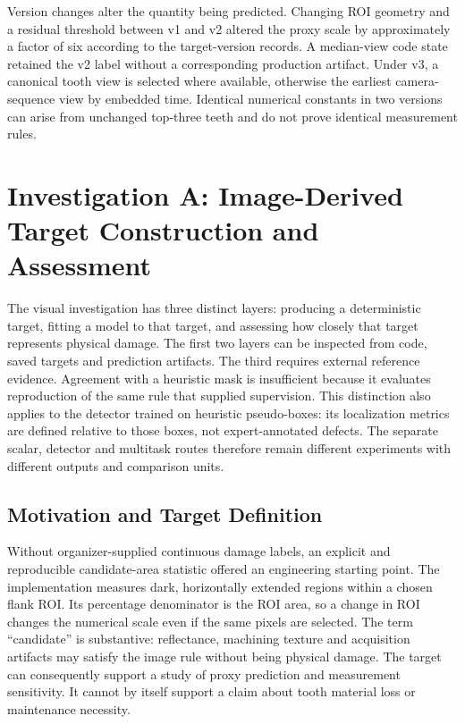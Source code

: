 Version changes alter the quantity being predicted. Changing ROI geometry and a residual threshold between v1 and v2 altered the proxy scale by approximately a factor of six according to the target-version records. A median-view code state retained the v2 label without a corresponding production artifact. Under v3, a canonical tooth view is selected where available, otherwise the earliest camera-sequence view by embedded time. Identical numerical constants in two versions can arise from unchanged top-three teeth and do not prove identical measurement rules.

\section{Investigation A: Image-Derived Target Construction and Assessment}
The visual investigation has three distinct layers: producing a deterministic target, fitting a model to that target, and assessing how closely that target represents physical damage. The first two layers can be inspected from code, saved targets and prediction artifacts. The third requires external reference evidence. Agreement with a heuristic mask is insufficient because it evaluates reproduction of the same rule that supplied supervision. This distinction also applies to the detector trained on heuristic pseudo-boxes: its localization metrics are defined relative to those boxes, not expert-annotated defects. The separate scalar, detector and multitask routes therefore remain different experiments with different outputs and comparison units.

\subsection{Motivation and Target Definition}
Without organizer-supplied continuous damage labels, an explicit and reproducible candidate-area statistic offered an engineering starting point. The implementation measures dark, horizontally extended regions within a chosen flank ROI. Its percentage denominator is the ROI area, so a change in ROI changes the numerical scale even if the same pixels are selected. The term ``candidate'' is substantive: reflectance, machining texture and acquisition artifacts may satisfy the image rule without being physical damage. The target can consequently support a study of proxy prediction and measurement sensitivity. It cannot by itself support a claim about tooth material loss or maintenance necessity.

